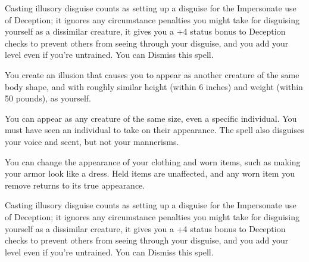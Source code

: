Casting illusory disguise counts as setting up a disguise for the Impersonate use of Deception;
it ignores any circumstance penalties you might take for disguising yourself as a dissimilar creature,
it gives you a +4 status bonus to Deception checks to prevent others from seeing through your disguise,
and you add your level even if you're untrained.
You can Dismiss this spell.

\egroup





\bgroup
\engschrift\small

You create an illusion that causes you to appear as another creature of the same body shape,
and with roughly similar height (within 6 inches) and weight (within 50 pounds), as yourself.

You can appear as any creature of the same size, even a specific individual.
You must have seen an individual to take on their appearance.
The spell also disguises your voice and scent, but not your mannerisms.

You can change the appearance of your clothing and worn items, such as making your armor look like a dress.
Held items are unaffected, and any worn item you remove returns to its true appearance.

Casting illusory disguise counts as setting up a disguise for the Impersonate use of Deception;
it ignores any circumstance penalties you might take for disguising yourself as a dissimilar creature,
it gives you a +4 status bonus to Deception checks to prevent others from seeing through your disguise,
and you add your level even if you're untrained.
You can Dismiss this spell.

\egroup